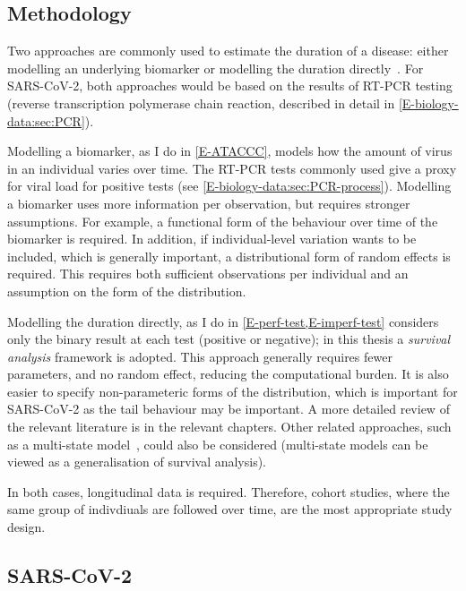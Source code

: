 \documentclass[thesis.tex]{subfiles}
\begin{document}

\subsection{Methodology}

Two approaches are commonly used to estimate the duration of a disease: either modelling an underlying biomarker or modelling the duration directly~\autocite{sweetingEstimating}.
For SARS-CoV-2, both approaches would be based on the results of RT-PCR testing (reverse transcription polymerase chain reaction, described in detail in \cref{E-biology-data:sec:PCR}).

Modelling a biomarker, as I do in \cref{E-ATACCC}, models how the amount of virus in an individual varies over time.
The RT-PCR tests commonly used give a proxy for viral load for positive tests (see \cref{E-biology-data:sec:PCR-process}).
Modelling a biomarker uses more information per observation, but requires stronger assumptions.
For example, a functional form of the behaviour over time of the biomarker is required.
In addition, if individual-level variation wants to be included, which is generally important, a distributional form of random effects is required.
This requires both sufficient observations per individual and an assumption on the form of the distribution.

Modelling the duration directly, as I do in \cref{E-perf-test,E-imperf-test} considers only the binary result at each test (positive or negative); in this thesis a \emph{survival analysis} framework is adopted.
This approach generally requires fewer parameters, and no random effect, reducing the computational burden.
It is also easier to specify non-parameteric forms of the distribution, which is important for SARS-CoV-2 as the tail behaviour may be important.
A more detailed review of the relevant literature is in the relevant chapters.
Other related approaches, such as a multi-state model~\autocite{jacksonMSM}, could also be considered (multi-state models can be viewed as a generalisation of survival analysis).

In both cases, longitudinal data is required.
Therefore, cohort studies, where the same group of indivdiuals are followed over time, are the most appropriate study design.

\subsection{SARS-CoV-2} \label{intro:sec:duration-SARS-CoV-2}
\end{document}

